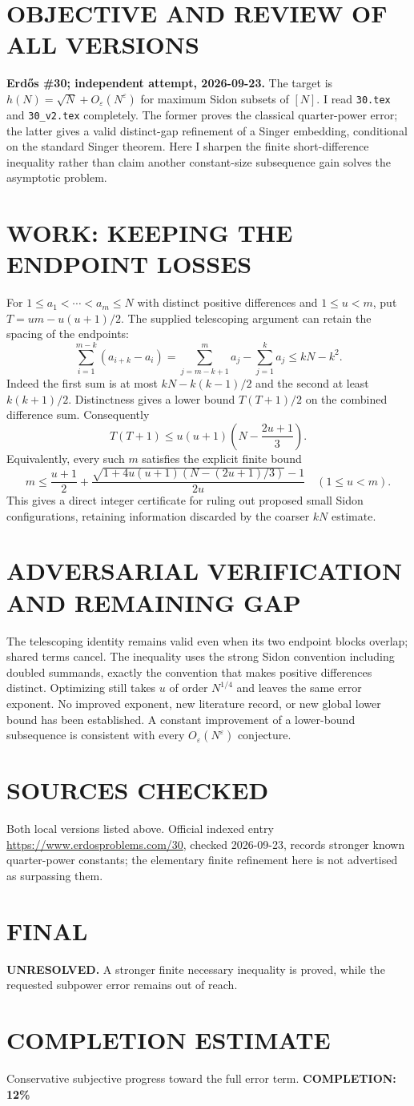 \section{OBJECTIVE AND REVIEW OF ALL VERSIONS}
\textbf{Erd\H{o}s \#30; independent attempt, 2026-09-23.}
The target is $h(N)=\sqrt N+O_\varepsilon(N^\varepsilon)$ for maximum Sidon subsets of $[N]$. I read \texttt{30.tex} and \texttt{30\_v2.tex} completely. The former proves the classical quarter-power error; the latter gives a valid distinct-gap refinement of a Singer embedding, conditional on the standard Singer theorem. Here I sharpen the finite short-difference inequality rather than claim another constant-size subsequence gain solves the asymptotic problem.
\section{WORK: KEEPING THE ENDPOINT LOSSES}
For $1\le a_1<\cdots<a_m\le N$ with distinct positive differences and $1\le u<m$, put $T=um-u(u+1)/2$. The supplied telescoping argument can retain the spacing of the endpoints:
\[
\sum_{i=1}^{m-k}(a_{i+k}-a_i)
=\sum_{j=m-k+1}^m a_j-\sum_{j=1}^k a_j
\le kN-k^2.
\]
Indeed the first sum is at most $kN-k(k-1)/2$ and the second at least $k(k+1)/2$. Distinctness gives a lower bound $T(T+1)/2$ on the combined difference sum. Consequently
\[
T(T+1)\le u(u+1)\left(N-\frac{2u+1}{3}\right).
\]
Equivalently, every such $m$ satisfies the explicit finite bound
\[
m\le\frac{u+1}{2}+
\frac{\sqrt{1+4u(u+1)(N-(2u+1)/3)}-1}{2u}
\quad(1\le u<m).
\]
This gives a direct integer certificate for ruling out proposed small Sidon configurations, retaining information discarded by the coarser $kN$ estimate.
\section{ADVERSARIAL VERIFICATION AND REMAINING GAP}
The telescoping identity remains valid even when its two endpoint blocks overlap; shared terms cancel. The inequality uses the strong Sidon convention including doubled summands, exactly the convention that makes positive differences distinct. Optimizing still takes $u$ of order $N^{1/4}$ and leaves the same error exponent. No improved exponent, new literature record, or new global lower bound has been established. A constant improvement of a lower-bound subsequence is consistent with every $O_\varepsilon(N^\varepsilon)$ conjecture.
\section{SOURCES CHECKED}
Both local versions listed above. Official indexed entry \url{https://www.erdosproblems.com/30}, checked 2026-09-23, records stronger known quarter-power constants; the elementary finite refinement here is not advertised as surpassing them.
\section{FINAL}
\textbf{UNRESOLVED.} A stronger finite necessary inequality is proved, while the requested subpower error remains out of reach.
\section{COMPLETION ESTIMATE}
Conservative subjective progress toward the full error term.
\textbf{COMPLETION: 12\%}
